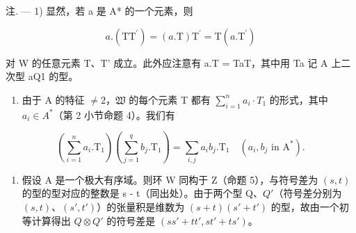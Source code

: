 注. --- 1) 显然，若 a 是 A* 的一个元素，则

\[
a. (\mathrm{TT} ^ {\prime}) = (a. \mathrm{T}) \mathrm{T} ^ {\prime} = \mathrm{T} (a. \mathrm{T} ^ {\prime})\tag{7}
\]

对 W 的任意元素 T、T' 成立。此外应注意有 a.T = TaT，其中用 Ta 记 A 上二次型 aQ1 的型。

\begin{enumerate}
\def\labelenumi{\arabic{enumi})}
\setcounter{enumi}{1}
\tightlist
\item
  由于 A 的特征 \(\neq 2\)，\(\mathfrak{W}\) 的每个元素 T 都有 \(\sum_{i=1}^{n} a_i \cdot T_1\) 的形式，其中 \(a_i \in A^*\)（第 2 小节命题 4）。我们有
\end{enumerate}

\[
(\sum_ {i = 1} ^ {n} a _ {i}. \mathrm{T} _ {1}) (\sum_ {j = 1} ^ {q} b _ {j}. \mathrm{T} _ {1}) = \sum_ {i, j} a _ {i} b _ {j}. \mathrm{T} _ {1} \quad (a _ {i}, b _ {j} \text {   in   } \mathrm{A} ^ {*}).\tag{8}
\]

\begin{enumerate}
\def\labelenumi{\arabic{enumi})}
\setcounter{enumi}{2}
\tightlist
\item
  假设 A 是一个极大有序域。则环 W 同构于 Z（命题 5），与符号差为 \((s, t)\) 的型的型对应的整数是 s - t（同出处）。由于两个型 Q、\(Q'\)（符号差分别为 \((s, t)\)、\((s', t')\)）的张量积是维数为 \((s + t)(s' + t')\) 的型，故由一个初等计算得出 \(Q \otimes Q'\) 的符号差是 \((ss' + tt', st' + ts')\)。
\end{enumerate}

